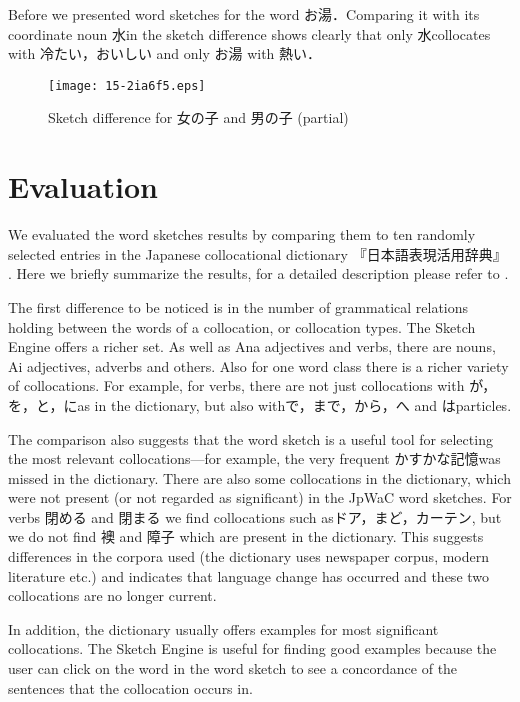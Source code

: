 \documentclass[english]{jnlp_1.4}
\begin{document}
Before we presented word sketches for the word お湯．Comparing it with its coordinate noun 水in the sketch difference shows clearly that only 水collocates with 冷たい，おいしい and only お湯 with 熱い．

\begin{figure}[b]
\begin{center}
\texttt{[image: 15-2ia6f5.eps]}
\caption{Sketch difference for 女の子 and 男の子 (partial)}
\label{fig5}
\end{center}
\end{figure}



\section{Evaluation}

We evaluated the word sketches results by comparing them to ten randomly
selected entries in the Japanese collocational dictionary
『日本語表現活用辞典』
. Here we briefly summarize the results, for a
detailed description please refer to .

The first difference to be noticed is in the number of grammatical relations holding between the words of a collocation, or collocation types. The Sketch Engine offers a richer set. As well as Ana adjectives and verbs, there are nouns, Ai adjectives, adverbs and others. Also for one word class there is a richer variety of collocations. For example, for verbs, there are not just collocations with が，を，と，にas in the dictionary, but also withで，まで，から，へ and はparticles. 

The comparison also suggests that the word sketch is a useful tool for selecting the most relevant collocations---for example, the very frequent かすかな記憶was missed in the dictionary. There are also some collocations in the dictionary, which were not present (or not regarded as significant) in the JpWaC word sketches. For verbs 閉める and 閉まる we find collocations such asドア，まど，カーテン, but we do not find 襖 and 障子 which are present in the dictionary. This suggests differences in the corpora used (the dictionary uses newspaper corpus, modern literature etc.) and indicates that language change has occurred and these two collocations are no longer current. 

In addition, the dictionary usually offers examples for most significant collocations. The Sketch Engine is useful for finding good examples because the user can click on the word in the word sketch to see a concordance of the sentences that the collocation occurs in. 
\end{document}
